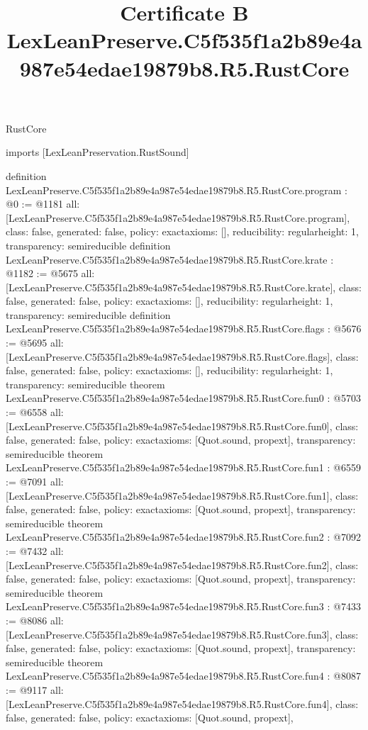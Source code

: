 \begin{lexlean}{RustCore}
\title{Certificate B LexLeanPreserve.C5f535f1a2b89e4a987e54edae19879b8.R5.RustCore}
\begin{coremodule}
imports [LexLeanPreservation.RustSound]

definition LexLeanPreserve.C5f535f1a2b89e4a987e54edae19879b8.R5.RustCore.program : @0 := @1181 {
  all: [LexLeanPreserve.C5f535f1a2b89e4a987e54edae19879b8.R5.RustCore.program],
  class: false,
  generated: false,
  policy: exact{axioms: []},
  reducibility: regular{height: 1},
  transparency: semireducible
}
definition LexLeanPreserve.C5f535f1a2b89e4a987e54edae19879b8.R5.RustCore.krate : @1182 := @5675 {
  all: [LexLeanPreserve.C5f535f1a2b89e4a987e54edae19879b8.R5.RustCore.krate],
  class: false,
  generated: false,
  policy: exact{axioms: []},
  reducibility: regular{height: 1},
  transparency: semireducible
}
definition LexLeanPreserve.C5f535f1a2b89e4a987e54edae19879b8.R5.RustCore.flags : @5676 := @5695 {
  all: [LexLeanPreserve.C5f535f1a2b89e4a987e54edae19879b8.R5.RustCore.flags],
  class: false,
  generated: false,
  policy: exact{axioms: []},
  reducibility: regular{height: 1},
  transparency: semireducible
}
theorem LexLeanPreserve.C5f535f1a2b89e4a987e54edae19879b8.R5.RustCore.fun0 : @5703 := @6558 {
  all: [LexLeanPreserve.C5f535f1a2b89e4a987e54edae19879b8.R5.RustCore.fun0],
  class: false,
  generated: false,
  policy: exact{axioms: [Quot.sound, propext]},
  transparency: semireducible
}
theorem LexLeanPreserve.C5f535f1a2b89e4a987e54edae19879b8.R5.RustCore.fun1 : @6559 := @7091 {
  all: [LexLeanPreserve.C5f535f1a2b89e4a987e54edae19879b8.R5.RustCore.fun1],
  class: false,
  generated: false,
  policy: exact{axioms: [Quot.sound, propext]},
  transparency: semireducible
}
theorem LexLeanPreserve.C5f535f1a2b89e4a987e54edae19879b8.R5.RustCore.fun2 : @7092 := @7432 {
  all: [LexLeanPreserve.C5f535f1a2b89e4a987e54edae19879b8.R5.RustCore.fun2],
  class: false,
  generated: false,
  policy: exact{axioms: [Quot.sound, propext]},
  transparency: semireducible
}
theorem LexLeanPreserve.C5f535f1a2b89e4a987e54edae19879b8.R5.RustCore.fun3 : @7433 := @8086 {
  all: [LexLeanPreserve.C5f535f1a2b89e4a987e54edae19879b8.R5.RustCore.fun3],
  class: false,
  generated: false,
  policy: exact{axioms: [Quot.sound, propext]},
  transparency: semireducible
}
theorem LexLeanPreserve.C5f535f1a2b89e4a987e54edae19879b8.R5.RustCore.fun4 : @8087 := @9117 {
  all: [LexLeanPreserve.C5f535f1a2b89e4a987e54edae19879b8.R5.RustCore.fun4],
  class: false,
  generated: false,
  policy: exact{axioms: [Quot.sound, propext]},
}
\end{coremodule}
\end{lexlean}
